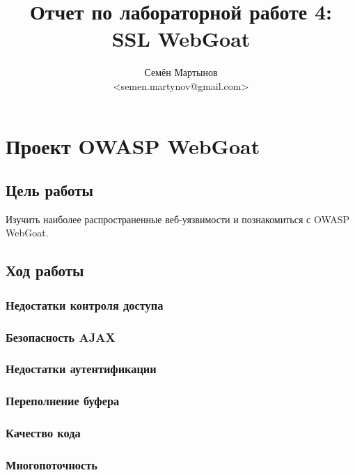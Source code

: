 \documentclass[a4paper, 12pt]{article}		%
\author{Семён Мартынов\\<semen.martynov@gmail.com>}
\title{Отчет по лабораторной работе 4:\\SSL WebGoat}
\begin{document}
\maketitle
\tableofcontents{}





\newpage
\section{Проект OWASP WebGoat}

\subsection{Цель работы}

Изучить наиболее распространенные веб-уязвимости и познакомиться с OWASP WebGoat.

\subsection{Ход работы}

\subsubsection{Недостатки контроля доступа}

\subsubsection{Безопасность AJAX}

\subsubsection{Недостатки аутентификации}

\subsubsection{Переполнение буфера}

\subsubsection{Качество кода}

\subsubsection{Многопоточность}
\end{document}
